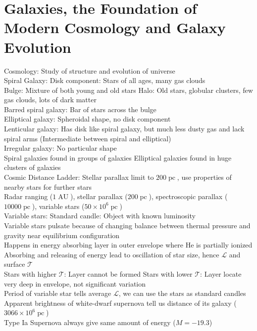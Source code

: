 \documentclass{article}
\DeclareMathOperator{\AU}{AU}
\DeclareMathOperator{\pc}{pc}
\begin{document}
\section{Galaxies, the Foundation of Modern Cosmology and Galaxy Evolution}
Cosmology: Study of structure and evolution of universe\\
Spiral Galaxy: Disk component: Stars of all ages, many gas clouds\\
Bulge: Mixture of both young and old stars \quad Halo: Old stars, globular clusters, few gas clouds, lots of dark matter\\
Barred spiral galaxy: Bar of stars across the bulge\\
Elliptical galaxy: Spheroidal shape, no disk component\\
Lenticular galaxy: Has disk like spiral galaxy, but much less dusty gas and lack spiral arms (Intermediate between spiral and elliptical)\\
Irregular galaxy: No particular shape\\
Spiral galaxies found in groups of galaxies \qquad Elliptical galaxies found in huge clusters of galaxies\\
Cosmic Distance Ladder: Stellar parallax limit to $200\pc$, use properties of nearby stars for further stars\\
Radar ranging ($1\AU$), stellar parallax ($200\pc$), spectroscopic parallax ($10000\pc$), variable stars ($50\times 10^{6}\pc$)\\
Variable stars: Standard candle: Object with known luminosity\\
Variable stars pulsate because of changing balance between thermal pressure and gravity near equilibrium configuration\\
Happens in energy absorbing layer in outer envelope where He is partially ionized \\ 
Absorbing and releasing of energy lead to oscillation of star size, hence $\mathcal{L}$ and surface $\mathcal{T}$\\
Stars with higher $\mathcal{T}$: Layer cannot be formed \quad Stars with lower $\mathcal{T}$: Layer locate very deep in envelope, not significant variation\\
Period of variable star tells average $\mathcal{L}$, we can use the stars as standard candles\\
Apparent brightness of white-dwarf supernova tell us distance of its galaxy ($3066\times 10^{6}\pc$) \\
Type Ia Supernova always give same amount of energy ($M=-19.3$)\\
\end{document}
